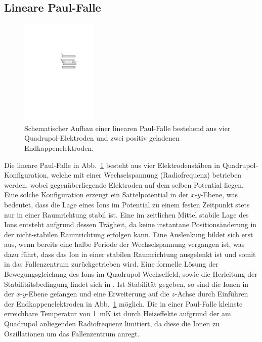 \documentclass[twocolumn]{revtex4}
\begin{document}
\subsection{Lineare Paul-Falle}
\begin{figure}[h]
	\centering
	\includegraphics[width=0.32\textwidth]{./figures/lineare_paulfalle.pdf}
	\caption{Schematischer Aufbau einer linearen Paul-Falle  bestehend aus vier Quadrupol-Elektroden und zwei positiv geladenen Endkappenelektroden.}
	\label{fig:paulfalle}
\end{figure}
Die lineare Paul-Falle in Abb.~\ref{fig:paulfalle} besteht aus vier Elektrodenstäben in Quadrupol-Konfiguration, welche mit einer Wechselspannung (Radiofrequenz) betrieben werden, wobei gegenüberliegende Elektroden auf dem selben Potential liegen.
Eine solche Konfiguration erzeugt ein Sattelpotential in der $x$-$y$-Ebene, was bedeutet, dass die Lage eines Ions im Potential zu einem festen Zeitpunkt stets nur in einer Raumrichtung stabil ist.
Eine im zeitlichen Mittel stabile Lage des Ions entsteht aufgrund dessen Trägheit, da keine instantane Positionsänderung in der nicht-stabilen Raumrichtung erfolgen kann.
Eine Auslenkung bildet sich erst aus, wenn bereits eine halbe Periode der Wechselspannung vergangen ist, was dazu führt, dass das Ion in einer stabilen Raumrichtung ausgelenkt ist und somit in das Fallenzentrum zurückgetrieben wird.
Eine formelle Lösung der Bewegungsgleichung des Ions im Quadrupol-Wechselfeld, sowie die Herleitung der Stabilitätsbedingung findet sich in \cite{foot}.
Ist Stabilität gegeben, so sind die Ionen in der $x$-$y$-Ebene gefangen und eine Erweiterung auf die $z$-Achse durch Einführen der Endkappenelektroden in Abb.~\ref{fig:paulfalle} möglich.
Die in einer Paul-Falle kleinste erreichbare Temperatur von \SI{1}{mK} ist durch Heizeffekte aufgrund der am Quadrupol anliegenden Radiofrequenz limitiert, da diese die Ionen zu Oszillationen um das Fallenzentrum anregt.
\end{document}
